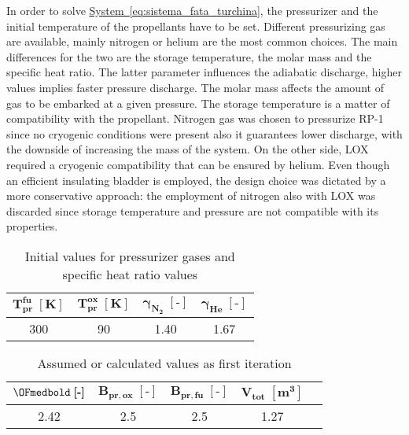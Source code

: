 In order to solve \hyperref[eq:sistema_fata_turchina]{System~\ref*{eq:sistema_fata_turchina}}, the pressurizer and the initial temperature of the propellants have to be set. Different pressurizing gas are available, mainly nitrogen or helium are the most common choices.
The main differences for the two are the storage temperature, the molar mass and the specific heat ratio. The latter parameter influences the adiabatic discharge, higher values implies faster pressure discharge.
The molar mass affects the amount of gas to be embarked at a given pressure. The storage temperature is a matter of compatibility with the propellant.
Nitrogen gas was chosen to pressurize RP-1 since no cryogenic conditions were present also it guarantees lower discharge, with the downside of increasing the mass of the system.
On the other side, LOX required a cryogenic compatibility that can be ensured by helium. Even though an efficient insulating bladder is employed, the design choice was dictated by a more conservative approach: the employment of nitrogen also with LOX was discarded since storage temperature and pressure are not compatible with its properties\cite{nist}.
\begin{table}[H]
    \renewcommand{\arraystretch}{1.5}
    \centering
    \begin{tabular}{|c|c|c|c|}
        \hline
        $\boldsymbol{T_{pr}^{fu}} \; [\textbf{K}]$ & $\boldsymbol{T_{pr}^{ox} \; [\textbf{K}]}$ & $\boldsymbol{\gamma_{N_2} \; [\textbf{-}]}$  & $\boldsymbol{\gamma_{He} \; [\textbf{-}]}$ \\
        \hline
        \hline
        300 & 90 & 1.40 & 1.67 \\
        \hline
    \end{tabular}
    \caption{Initial values for pressurizer gases and specific heat ratio values}
    \label{table:press_value}
\end{table}

\begin{table}[H]
    \renewcommand{\arraystretch}{1.4}
    \centering
    \begin{tabular}{|c|c|c|c|c|}
        \hline
        $\OFmedbold \; \boldsymbol{[\textbf{-}]}$ & $\boldsymbol{B_{pr,ox} \; [\textbf{-}]}$ & $\boldsymbol{B_{pr,fu} \; [\textbf{-}]}$  & $\boldsymbol{V_{tot} \; [\textbf{m}^3]}$ \\
        \hline
        \hline
        2.42 & 2.5 & 2.5 & 1.27 \\
        \hline
    \end{tabular}
    \caption{Assumed or calculated values as first iteration}
    \label{table:fata_turchina_valori_assunti}
\end{table}


